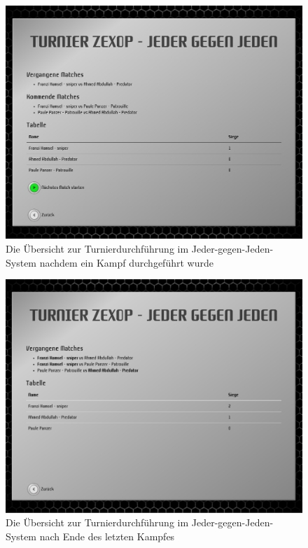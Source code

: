 \begin{figure}
  \centering
  \label{tournament-execution-mid}
  \includegraphics[width=15cm, keepaspectratio]{figures/13-turnierdurchfuehrung-mitte.png}
  \caption{Die Übersicht zur Turnierdurchführung im Jeder-gegen-Jeden-System nachdem ein Kampf durchgeführt wurde}
\end{figure}

\begin{figure}
  \centering
  \label{tournament-execution-end}
  \includegraphics[width=15cm, keepaspectratio]{figures/15-turnierdurchfuehrung-ende.png}
  \caption{Die Übersicht zur Turnierdurchführung im Jeder-gegen-Jeden-System nach Ende des letzten Kampfes}
\end{figure}

